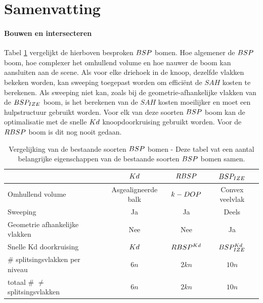 \section{Samenvatting}
\paragraph{Bouwen en intersecteren} 
Tabel \ref{tab:boom-vergelijking} vergelijkt de hierboven besproken $\symBSP$ bomen.
Hoe algemener de $\symBSP$ boom, hoe complexer het omhullend volume en hoe nauwer de boom kan aansluiten aan de scene.
Als voor elke driehoek in de knoop, dezelfde vlakken bekeken worden, kan sweeping toegepast worden om efficiënt de $SAH$ kosten te berekenen.
Als sweeping niet kan, zoals bij de geometrie-afhankelijke vlakken van de $BSP_{IZE}$ boom, is het berekenen van de $SAH$ kosten moeilijker en moet een hulpstructuur gebruikt worden.
Voor elk van deze soorten $\symBSP$ boom kan de optimalisatie met de snelle $Kd$ knoopdoorkruising gebruikt worden. Voor de $RBSP$ boom is dit nog nooit gedaan.

\begin{table}[tb]
    \centering
    \begin{tabular}{@{}|l|c|c|c|@{}} \toprule      
            & $Kd$     & $RBSP$ & $BSP_{IZE}$ \\ \midrule
      Omhullend volume & Asgealigneerde balk & $k-DOP$ & Convex veelvlak \\
      Sweeping                              &  Ja   & Ja & Deels    \\
      Geometrie afhankelijke vlakken & Nee & Nee & Ja \\
      Snelle Kd doorkruising                 & $Kd$  & $RBSP^{Kd}$ \footnotemark[1] & $BSP^{Kd}_{IZE}$    \\
      \# splitsingsvlakken per niveau       &  $6n$   & $2kn$ & $10n$  \\
      totaal \# $\neq$ splitsingsvlakken           &  $6n$   & $2kn$ & $10n$     \\ \bottomrule
    \end{tabular}
    \caption[Vergelijking van de bestaande soorten $\symBSP$ bomen.]{Vergelijking van de bestaande soorten $\symBSP$ bomen - \small Deze tabel vat een aantal belangrijke eigenschappen van de bestaande soorten $\symBSP$ bomen samen. }
    \label{tab:boom-vergelijking}
  \end{table}

